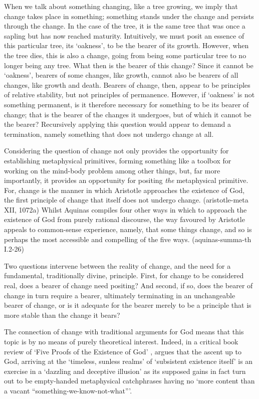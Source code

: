 When we talk about something changing, like a tree growing, we imply that change takes place in something; something stands under the change and persists through the change. In the case of the tree, it is the same tree that was once a sapling but has now reached maturity.
Intuitively, we must posit an essence of this particular tree, its `oakness', to be the bearer of its growth. However, when the tree dies, this is also a change, going from being some particular tree to no longer being any tree.
What then is the bearer of this change? Since it cannot be `oakness', bearers of some changes, like growth, cannot also be bearers of all changes, like growth and death. Bearers of change, then, appear to be principles of relative stability, but not principles of permanence.
However, if `oakness' is not something permanent, is it therefore necessary for something to be its bearer of change; that is the bearer of the changes it undergoes, but of which it cannot be the bearer?
Recursively applying this question would appear to demand a termination, namely something that does not undergo change at all.

Considering the question of change not only provides the opportunity for establishing metaphysical primitives, forming something like a toolbox for working on the mind-body problem among other things, but, far more importantly, it provides an opportunity for positing \emph{the} metaphysical primitive. For, change is the manner in which Aristotle approaches the existence of God, the first principle of change that itself does not undergo change.
(\acrshort{aristotle-meta} XII, 1072a)
Whilst Aquinas compiles four other ways in which to approach the existence of God from purely rational discourse, the way favoured by Aristotle appeals to common-sense experience, namely, that some things change, and so is perhaps the most accessible and compelling of the five ways.
(\acrshort{aquinas-summa-th} I.2-26)

Two questions intervene between the reality of change, and the need for a fundamental, traditionally divine, principle. First, for change to be considered real, does a bearer of change need positing? And second, if so, does the bearer of change in turn require a bearer, ultimately terminating in an unchangeable bearer of change, or is it adequate for the bearer merely to be a principle that is more stable than the change it bears?

The connection of change with traditional arguments for God means that this topic is by no means of purely theoretical interest. Indeed, in a critical book review of `Five Proofs of the Existence of God' \parencite[][]{feser2017five}, \textcite[][]{Blackburn2018TLS} argues that the ascent up to God, arriving at the `timeless, sunless realms' of `subsistent existence itself' is an exercise in a `dazzling and deceptive illusion' as its supposed gains in fact turn out to be empty-handed metaphysical catchphrases having no `more content than a vacant ``something-we-know-not-what'''.

